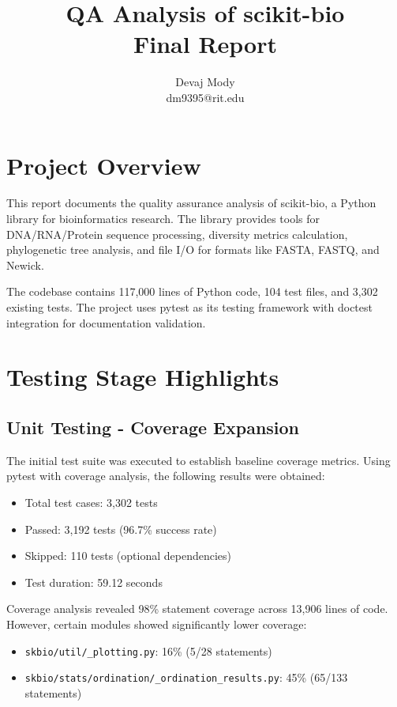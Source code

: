 \documentclass[11pt]{article}
\title{QA Analysis of scikit-bio\\Final Report}
\author{Devaj Mody\\dm9395@rit.edu}
\begin{document}
\maketitle

\section{Project Overview}

This report documents the quality assurance analysis of scikit-bio, a Python library for bioinformatics research. The library provides tools for DNA/RNA/Protein sequence processing, diversity metrics calculation, phylogenetic tree analysis, and file I/O for formats like FASTA, FASTQ, and Newick.

The codebase contains 117,000 lines of Python code, 104 test files, and 3,302 existing tests. The project uses pytest as its testing framework with doctest integration for documentation validation.

\section{Testing Stage Highlights}

\subsection{Unit Testing - Coverage Expansion}

The initial test suite was executed to establish baseline coverage metrics. Using pytest with coverage analysis, the following results were obtained:

\begin{itemize}[noitemsep]
    \item Total test cases: 3,302 tests
    \item Passed: 3,192 tests (96.7\% success rate)
    \item Skipped: 110 tests (optional dependencies)
    \item Test duration: 59.12 seconds
\end{itemize}

Coverage analysis revealed 98\% statement coverage across 13,906 lines of code. However, certain modules showed significantly lower coverage:

\begin{itemize}[noitemsep]
    \item \texttt{skbio/util/\_plotting.py}: 16\% (5/28 statements)
    \item \texttt{skbio/stats/ordination/\_ordination\_results.py}: 45\% (65/133 statements)
\end{itemize}
\end{document}
